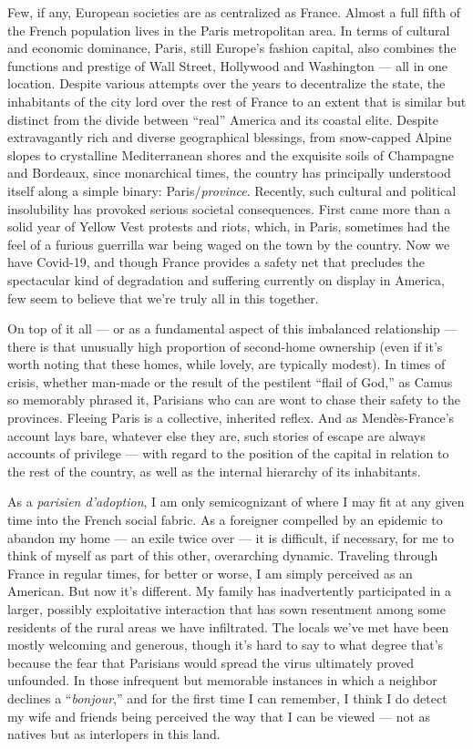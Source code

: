 Few, if any, European societies are as centralized as France. Almost a
full fifth of the French population lives in the Paris metropolitan
area. In terms of cultural and economic dominance, Paris, still Europe's
fashion capital, also combines the functions and prestige of Wall
Street, Hollywood and Washington --- all in one location. Despite
various attempts over the years to decentralize the state, the
inhabitants of the city lord over the rest of France to an extent that
is similar but distinct from the divide between ``real'' America and its
coastal elite. Despite extravagantly rich and diverse geographical
blessings, from snow-capped Alpine slopes to crystalline Mediterranean
shores and the exquisite soils of Champagne and Bordeaux, since
monarchical times, the country has principally understood itself along a
simple binary: Paris/\emph{province}. Recently, such cultural and
political insolubility has provoked serious societal consequences. First
came more than a solid year of Yellow Vest protests and riots, which, in
Paris, sometimes had the feel of a furious guerrilla war being waged on
the town by the country. Now we have Covid-19, and though France
provides a safety net that precludes the spectacular kind of degradation
and suffering currently on display in America, few seem to believe that
we're truly all in this together.

On top of it all --- or as a fundamental aspect of this imbalanced
relationship --- there is that unusually high proportion of second-home
ownership (even if it's worth noting that these homes, while lovely, are
typically modest). In times of crisis, whether man-made or the result of
the pestilent ``flail of God,'' as Camus so memorably phrased it,
Parisians who can are wont to chase their safety to the provinces.
Fleeing Paris is a collective, inherited reflex. And as Mendès-France's
account lays bare, whatever else they are, such stories of escape are
always accounts of privilege --- with regard to the position of the
capital in relation to the rest of the country, as well as the internal
hierarchy of its inhabitants.

As a \emph{parisien d'adoption}, I am only semicognizant of where I may
fit at any given time into the French social fabric. As a foreigner
compelled by an epidemic to abandon my home --- an exile twice over ---
it is difficult, if necessary, for me to think of myself as part of this
other, overarching dynamic. Traveling through France in regular times,
for better or worse, I am simply perceived as an American. But now it's
different. My family has inadvertently participated in a larger,
possibly exploitative interaction that has sown resentment among some
residents of the rural areas we have infiltrated. The locals we've met
have been mostly welcoming and generous, though it's hard to say to what
degree that's because the fear that Parisians would spread the virus
ultimately proved unfounded. In those infrequent but memorable instances
in which a neighbor declines a ``\emph{bonjour},'' and for the first
time I can remember, I think I do detect my wife and friends being
perceived the way that I can be viewed --- not as natives but as
interlopers in this land.

